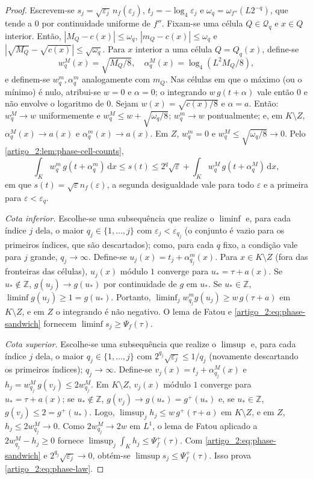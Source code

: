 \documentclass[12pt,a4paper]{article}
\theoremstyle{preciso}
\theoremstyle{definition}
\newcommand{\dd}{\,\mathrm{d}}
\theoremstyle{preciso}
\theoremstyle{preciso}
\theoremstyle{preciso}
\theoremstyle{preciso}
\theoremstyle{definition}
\theoremstyle{preciso}
\theoremstyle{definition}
\theoremstyle{preciso}
\theoremstyle{preciso}
\theoremstyle{definition}
\begin{document}
\begin{proof}
Escrevem-se $s_j=\sqrt{\varepsilon_j}\,n_f(\varepsilon_j)$, $t_j=-\log_4\varepsilon_j$ e
$\omega_q=\omega_{f''}(L2^{-q})$, que tende a $0$ por continuidade uniforme de
$f''$. Fixam-se uma célula $Q\in\mathcal Q_q$ e $x\in Q$ interior. Então,
$|M_Q-c(x)|\le\omega_q$, $|m_Q-c(x)|\le\omega_q$ e
$|\sqrt{M_Q}-\sqrt{c(x)}|\le\sqrt{\omega_q}$. Para $x$ interior a uma célula
$Q=Q_q(x)$, define-se
\[
 w^M_q(x)=\sqrt{M_Q/8},\quad \alpha^M_q(x)=\log_4(L^2M_Q/8),
\]
e definem-se $w^m_q,\alpha^m_q$ analogamente com $m_Q$. Nas células em que o máximo (ou
o mínimo) é nulo, atribui-se $w=0$ e $\alpha=0$; o integrando $w\,g(t+\alpha)$ vale
então $0$ e não envolve o logaritmo de $0$.
Sejam $w(x)=\sqrt{c(x)/8}$ e $\alpha=a$. Então:
$w^M_q\to w$ uniformemente e $w^M_q\le w+\sqrt{\omega_q/8}$;
$w^m_q\to w$ pontualmente; e, em $K\setminus Z$, $\alpha^M_q(x)\to a(x)$ e
$\alpha^m_q(x)\to a(x)$. Em $Z$, $w^m_q=0$ e $w^M_q\le\sqrt{\omega_q/8}\to0$.
Pelo \cref{artigo_2:lem:phase-cell-counts},
\begin{equation}
 \int_Kw^m_q\,g(t+\alpha^m_q)\dd x\le s(t)\le2^q\sqrt\varepsilon
 +\int_Kw^M_q\,g(t+\alpha^M_q)\dd x,
 \label{artigo_2:eq:phase-sandwich}
\end{equation}
em que $s(t)=\sqrt\varepsilon n_f(\varepsilon)$, a segunda desigualdade vale para
todo $\varepsilon$ e a primeira para $\varepsilon<\varepsilon_q$.

\emph{Cota inferior.} Escolhe-se uma subsequência que realize o $\liminf$ e, para
cada índice $j$ dela, o maior $q_j\in\{1,\dots,j\}$ com $\varepsilon_j<\varepsilon_{q_j}$
(o conjunto é vazio para os primeiros índices, que são descartados);
como, para cada $q$ fixo, a condição vale para $j$ grande, $q_j\to\infty$.
Define-se $u_j(x)=t_j+\alpha^m_{q_j}(x)$. Para $x\in K\setminus Z$ (fora das fronteiras
das células), $u_j(x)$ módulo $1$ converge para $u_*=\tau+a(x)$. Se
$u_*\notin\mathbb Z$, $g(u_j)\to g(u_*)$ por continuidade de $g$ em $u_*$. Se
$u_*\in\mathbb Z$, $\liminf g(u_j)\ge1=g(u_*)$. Portanto,
$\liminf_jw^m_{q_j}g(u_j)\ge w\,g(\tau+a)$ em $K\setminus Z$, e em $Z$ o integrando é
não negativo. O lema de Fatou e \eqref{artigo_2:eq:phase-sandwich} fornecem
$\liminf s_j\ge\Psi_f(\tau)$.

\emph{Cota superior.} Escolhe-se uma subsequência que realize o $\limsup$ e, para
cada índice $j$ dela, o maior $q_j\in\{1,\dots,j\}$ com $2^{q_j}\sqrt{\varepsilon_j}\le1/q_j$
(novamente descartando os primeiros índices); $q_j\to\infty$. Define-se $v_j(x)=t_j+\alpha^M_{q_j}(x)$ e
$h_j=w^M_{q_j}\,g(v_j)\le2w^M_{q_j}$. Em $K\setminus Z$, $v_j(x)$ módulo $1$
converge para $u_*=\tau+a(x)$; se $u_*\notin\mathbb Z$, $g(v_j)\to g(u_*)=g^+(u_*)$ e,
se $u_*\in\mathbb Z$, $g(v_j)\le2=g^+(u_*)$. Logo,
$\limsup_jh_j\le w\,g^+(\tau+a)$ em $K\setminus Z$, e em $Z$, $h_j\le2w^M_{q_j}\to0$.
Como $2w^M_{q_j}\to2w$ em $L^1$, o lema de Fatou aplicado a
$2w^M_{q_j}-h_j\ge0$ fornece $\limsup_j\int_Kh_j\le\Psi_f^+(\tau)$. Com
\eqref{artigo_2:eq:phase-sandwich} e $2^{q_j}\sqrt{\varepsilon_j}\to0$, obtém-se
$\limsup s_j\le\Psi_f^+(\tau)$. Isso prova \eqref{artigo_2:eq:phase-law}.


\end{proof}
\end{document}
